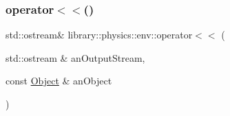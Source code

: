 \subsubsection{\texorpdfstring{operator$<$$<$()}{operator<<()}}
{\footnotesize\ttfamily std\+::ostream\& library\+::physics\+::env\+::operator$<$$<$ (\begin{DoxyParamCaption}\item[{std\+::ostream \&}]{an\+Output\+Stream,  }\item[{const \hyperlink{classlibrary_1_1physics_1_1env_1_1_object}{Object} \&}]{an\+Object }\end{DoxyParamCaption})}


